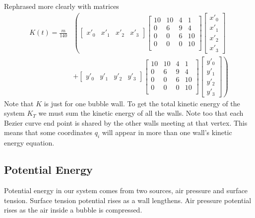 \documentclass{article}
\begin{document}
Rephrased more clearly with matrices
\begin{align}
K(t)=
\frac{m}{140} &\left(
\begin{bmatrix} x'_0 & x'_1 & x'_2 & x'_3 \end{bmatrix}
 \begin{bmatrix} 
10 & 10 & 4 & 1\\
0 & 6 & 9 & 4\\
0 & 0 & 6 & 10\\
0 & 0 & 0 & 10\\ 
\end{bmatrix}
\begin{bmatrix} x'_0\\x'_1\\x'_2\\x'_3 \end{bmatrix}
\right.\\
&+ \left.
\begin{bmatrix} y'_0 & y'_1 & y'_2 & y'_3 \end{bmatrix}
 \begin{bmatrix} 
10 & 10 & 4 & 1\\
0 & 6 & 9 & 4\\
0 & 0 & 6 & 10\\
0 & 0 & 0 & 10\\ 
\end{bmatrix}
\begin{bmatrix} y'_0\\y'_1\\y'_2\\y'_3 \end{bmatrix} 
\right)\nonumber
\end{align}
Note that $K$ is just for one bubble wall. To get the total
kinetic energy of the system $K_T$ we must sum the kinetic energy of all the
walls. Note too that each Bezier curve end point is shared by the other walls
meeting at that vertex. This means that some coordinates $q_i$ will appear in
more than one wall's kinetic energy equation.
\subsection{Potential Energy}
Potential energy in our system comes from two sources, air pressure and surface
tension. Surface tension potential rises as a wall lengthens.
Air pressure potential rises as the air inside a bubble is compressed.
\end{document}
